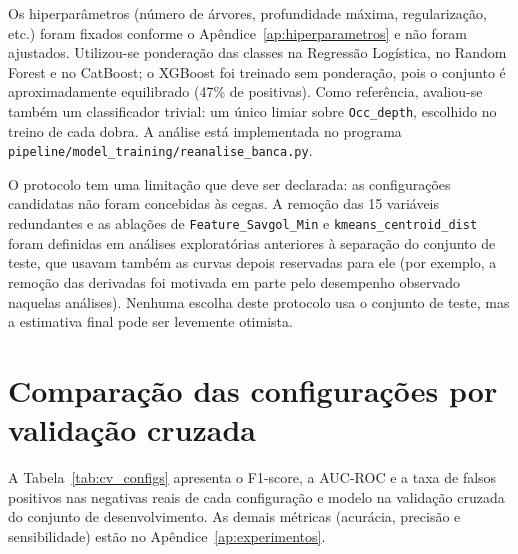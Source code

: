 Os hiperparâmetros (número de árvores, profundidade máxima, regularização, etc.) foram fixados conforme o Apêndice~\ref{ap:hiperparametros} e não foram ajustados. Utilizou-se ponderação das classes na Regressão Logística, no Random Forest e no CatBoost; o XGBoost foi treinado sem ponderação, pois o conjunto é aproximadamente equilibrado (47\% de positivas). Como referência, avaliou-se também um classificador trivial: um único limiar sobre \texttt{Occ\_depth}, escolhido no treino de cada dobra. A análise está implementada no programa \texttt{pipeline/model\_training/reanalise\_banca.py}.

O protocolo tem uma limitação que deve ser declarada: as configurações candidatas não foram concebidas às cegas. A remoção das 15 variáveis redundantes e as ablações de \texttt{Feature\_Savgol\_Min} e \texttt{kmeans\_centroid\_dist} foram definidas em análises exploratórias anteriores à separação do conjunto de teste, que usavam também as curvas depois reservadas para ele (por exemplo, a remoção das derivadas foi motivada em parte pelo desempenho observado naquelas análises). Nenhuma escolha deste protocolo usa o conjunto de teste, mas a estimativa final pode ser levemente otimista.

\section{Comparação das configurações por validação cruzada}
\label{sec:cross_validation}
\label{sec:comparacao}

A Tabela~\ref{tab:cv_configs} apresenta o F1-score, a AUC-ROC e a taxa de falsos positivos nas negativas reais de cada configuração e modelo na validação cruzada do conjunto de desenvolvimento. As demais métricas (acurácia, precisão e sensibilidade) estão no Apêndice~\ref{ap:experimentos}.

